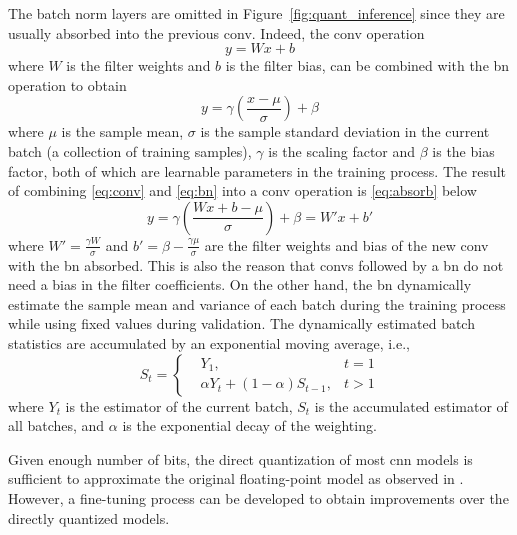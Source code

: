 \documentclass{article}
\begin{document}
The batch norm layers are omitted in Figure~\ref{fig:quant_inference} since they are usually absorbed into the previous \gls{conv}.
Indeed, the \gls{conv} operation
%
\begin{equation}
y = Wx + b
\label{eq:conv}
\end{equation}
%
where $W$ is the filter weights and $b$ is the filter bias, can be combined with
the \gls{bn} operation to obtain
\begin{equation}
y = \gamma \left(\frac{x - \mu}{\sigma}\right) + \beta
\label{eq:bn}
\end{equation}
%
where $\mu$ is the sample mean, $\sigma$ is the sample standard deviation in the current batch (a collection of training samples), $\gamma$ is the scaling factor and $\beta$ is the bias factor, both of which are learnable parameters in the training process.
The result of combining \eqref{eq:conv} and \eqref{eq:bn} into a \gls{conv} operation is \eqref{eq:absorb} below
\begin{equation}
     y = \gamma \left(\frac{Wx + b - \mu}{\sigma}\right) + \beta = W' x + b'
     \label{eq:absorb}
\end{equation}
where $W' = \frac{\gamma W}{\sigma}$ and $b' = \beta - \frac{\gamma \mu}{\sigma}$ are the filter weights and bias of the new \gls{conv} with the \gls{bn} absorbed.
This is also the reason that \glspl{conv} followed by a \gls{bn} do not need a bias in the filter coefficients.%
On the other hand, the \gls{bn} dynamically estimate the sample mean and variance of each batch during the training process while using fixed values during validation.
The dynamically estimated batch statistics are accumulated by an exponential moving average, i.e.,
%
\begin{equation}
S_t = \left\{
\begin{aligned}
&Y_1, & t= 1\\
&\alpha Y_t + (1 - \alpha) S_{t-1}, & t > 1
\end{aligned}
\right.
\end{equation}
%
where $Y_t$ is the estimator of the current batch, $S_t$ is the accumulated estimator of all batches, and $\alpha$ is the exponential decay of the weighting.

Given enough number of bits, the direct quantization of most \gls{cnn} models is sufficient to approximate the original floating-point model as observed in \textcite{krishnamoorthi2018quantizing}.
However, a fine-tuning process can be developed to obtain improvements over the directly quantized models.
\end{document}
